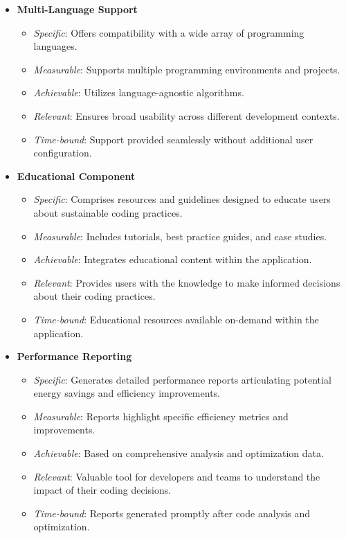 \documentclass[conference,compsoc]{IEEEtran}
\begin{document}
\begin{itemize}
	\item \textbf{Multi-Language Support}
	      \begin{itemize}
		      \item \textit{Specific}: Offers compatibility with a wide array of programming languages.
		      \item \textit{Measurable}: Supports multiple programming environments and projects.
		      \item \textit{Achievable}: Utilizes language-agnostic algorithms.
		      \item \textit{Relevant}: Ensures broad usability across different development contexts.
		      \item \textit{Time-bound}: Support provided seamlessly without additional user configuration.
	      \end{itemize}
	\item \textbf{Educational Component}
	      \begin{itemize}
		      \item \textit{Specific}: Comprises resources and guidelines designed to educate users about sustainable coding practices.
		      \item \textit{Measurable}: Includes tutorials, best practice guides, and case studies.
		      \item \textit{Achievable}: Integrates educational content within the application.
		      \item \textit{Relevant}: Provides users with the knowledge to make informed decisions about their coding practices.
		      \item \textit{Time-bound}: Educational resources available on-demand within the application.
	      \end{itemize}
	\item \textbf{Performance Reporting}
	      \begin{itemize}
		      \item \textit{Specific}: Generates detailed performance reports articulating potential energy savings and efficiency improvements.
		      \item \textit{Measurable}: Reports highlight specific efficiency metrics and improvements.
		      \item \textit{Achievable}: Based on comprehensive analysis and optimization data.
		      \item \textit{Relevant}: Valuable tool for developers and teams to understand the impact of their coding decisions.
		      \item \textit{Time-bound}: Reports generated promptly after code analysis and optimization.
	      \end{itemize}
\end{itemize}
\end{document}
